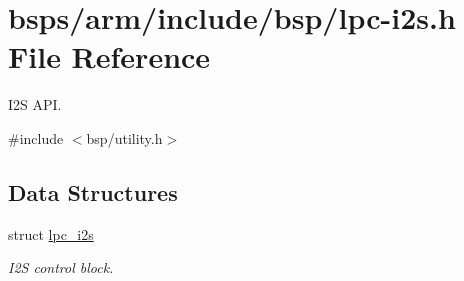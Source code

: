 \hypertarget{lpc-i2s_8h}{}\section{bsps/arm/include/bsp/lpc-\/i2s.h File Reference}
\label{lpc-i2s_8h}


I2S A\+PI.  


{\ttfamily \#include $<$bsp/utility.\+h$>$}\newline
\subsection*{Data Structures}
\begin{DoxyCompactItemize}
\item 
struct \mbox{\hyperlink{structlpc__i2s}{lpc\+\_\+i2s}}
\begin{DoxyCompactList}\small\item\em I2S control block. \end{DoxyCompactList}\end{DoxyCompactItemize}
